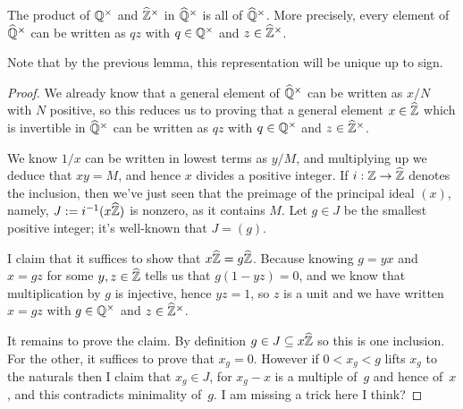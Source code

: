 \begin{lemma}
    \label{QHat.unitsrat_join_unitszHat}
    \leanok
    The product of $\mathbb{Q}^\times$ and $\widehat{\mathbb{Z}}^\times$ in $\widehat{\mathbb{Q}}^\times$ is all of $\widehat{\mathbb{Q}}^\times$.
    More precisely, every element of $\widehat{\mathbb{Q}}^\times$ can be written as $qz$ with $q\in\mathbb{Q}^\times$
    and $z\in\widehat{\mathbb{Z}}^\times$.
\end{lemma}
Note that by the previous lemma, this representation will be unique up to sign.
\begin{proof}
  We already know that a general element of $\widehat{\mathbb{Q}}^\times$ can be written as $x/N$ with $N$
  positive, so this reduces us to proving that a general element $x\in\widehat{\mathbb{Z}}$ which is invertible
  in $\widehat{\mathbb{Q}}^\times$ can be written as $qz$ with $q\in\mathbb{Q}^\times$ and $z\in\widehat{\mathbb{Z}}^\times$.

  We know $1/x$ can be written in lowest terms as $y/M$, and multiplying up we deduce
  that $xy=M$, and hence $x$ divides a positive integer. If $i:\mathbb{Z}\to\widehat{\mathbb{Z}}$ denotes
  the inclusion, then we've just seen that the preimage of the principal
  ideal $(x)$, namely, $J:=i^{-1}(x\widehat{\mathbb{Z}})$ is nonzero, as it contains $M$.
  Let $g\in J$ be the smallest positive integer; it's well-known that $J=(g)$.

  I claim that it suffices to show that $x\widehat{\mathbb{Z}}=g\widehat{\mathbb{Z}}$. Because knowing $g=yx$ and
  $x=gz$ for some $y,z\in\widehat{\mathbb{Z}}$ tells us that $g(1-yz)=0$, and we know that multiplication by $g$ is injective,
  hence $yz=1$, so $z$ is a unit and we have written $x=gz$ with $g\in\mathbb{Q}^\times$ and $z\in\widehat{\mathbb{Z}}^\times$.

  It remains to prove the claim. By definition $g\in J\subseteq x\widehat{\mathbb{Z}}$ so this is one
  inclusion. For the other, it suffices to prove that $x_g=0$. However if $0<x_g<g$
  lifts $x_g$ to the naturals then I claim that $x_g\in J$, for $x_g-x$ is a multiple
  of~$g$ and hence of~$x$, and this contradicts minimality of~$g$. I am missing a
  trick here I think?
\end{proof}
